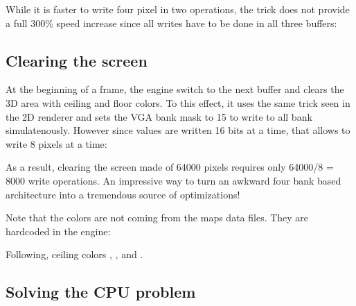 While it is faster to write four pixel in two operations, the trick does not provide a full 300\% speed increase since all writes have to be done in all three buffers:\\
\par
\begin{minipage}{\textwidth}

\end{minipage}



\subsection{Clearing the screen}
At the beginning of a frame, the engine switch to the next buffer and clears the 3D area with ceiling and floor colors. To this effect, it uses the same trick seen in the 2D renderer and sets the VGA bank mask to 15 to write to all bank simulatenously. However since values are written 16 bits at a time, that allows to write 8 pixels at a time:\\ 
\par
\begin{minipage}{\textwidth}
 
 \end{minipage}
\par
As a result, clearing the screen made of 64000 pixels requires only 64000/8 = 8000 write operations. An impressive way to turn an awkward four bank based architecture into a tremendous source of optimizations!\\
\par
Note that the colors are not coming from the maps data files. They are hardcoded in the engine:\\
\par
\begin{minipage}{\textwidth}
 
 \end{minipage}
\par


Following, ceiling colors , ,  and .\\ 
\par
{}






\subsection{Solving the CPU problem}


